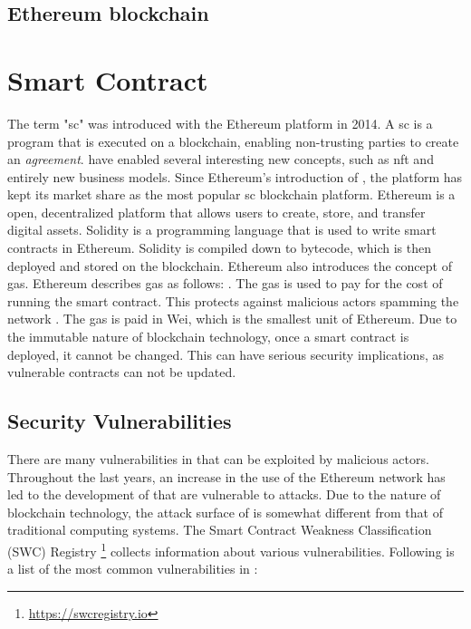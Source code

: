 \subsection{Ethereum blockchain}
\label{sec:ethereum}


\section{Smart Contract}
\label{sec:smart-contract}
The term "\acrlong{sc}" was introduced with the Ethereum platform in 2014. A \acrfull{sc} is a program that is executed on a blockchain, enabling non-trusting parties to create an \textit{agreement}.  have enabled several interesting new concepts, such as \acrfull{nft} and entirely new business models. Since Ethereum's introduction of , the platform has kept its market share as the most popular \acrshort{sc} blockchain platform. Ethereum is a open, decentralized platform that allows users to create, store, and transfer digital assets. Solidity is a programming language that is used to write smart contracts in Ethereum. Solidity is compiled down to bytecode, which is then deployed and stored on the blockchain. Ethereum also introduces the concept of gas. Ethereum describes gas as follows:  \cite{ethereum2021gas}. The gas is used to pay for the cost of running the smart contract. This protects against malicious actors spamming the network \cite{ethereum2021gas}. The gas is paid in Wei, which is the smallest unit of Ethereum. Due to the immutable nature of blockchain technology, once a smart contract is deployed, it cannot be changed. This can have serious security implications, as vulnerable contracts can not be updated.

\subsection{Security Vulnerabilities}
\label{sec:smart-contract-vulnerabilities}
There are many vulnerabilities in  that can be exploited by malicious actors. Throughout the last years, an increase in the use of the Ethereum network has led to the development of  that are vulnerable to attacks. Due to the nature of blockchain technology, the attack surface of  is somewhat different from that of traditional computing systems. The Smart Contract Weakness Classification (SWC) Registry \footnote{\url{https://swcregistry.io}} collects information about various vulnerabilities. Following is a list of the most common vulnerabilities in :

